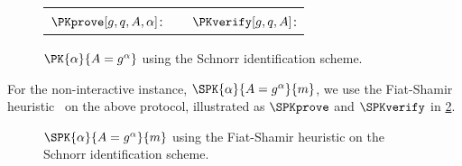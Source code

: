 \begin{figure*}
  \centering
  \begin{tabular}{lcl}
    \(\PKprove[g, q, A, \alpha]\):
    &
    & \(\PKverify[g, q, A]\):
    \\

  \end{tabular}
  \caption{%
    \(\PK{\alpha}{A = g^\alpha}\) using the Schnorr identification scheme.
  }%
  \label{PKalgorithms}
\end{figure*}


For the non-interactive instance, \(\SPK{\alpha}{A = g^\alpha}{m}\), we use the 
Fiat-Shamir heuristic~\cite{FiatShamirHeuristic} on the above protocol, 
illustrated as \(\SPKprove\) and \(\SPKverify\) in \cref{SPKalgorithms}.

\begin{figure*}
  \begin{minipage}[t]{0.48\linewidth}
    \begin{algorithmic}
      \EndFunction{}
    \end{algorithmic}
  \end{minipage}
  \hfill
  \begin{minipage}[t]{0.48\linewidth}
    \begin{algorithmic}
        \Else{}
        \EndIf{}
      \EndFunction{}
    \end{algorithmic}
  \end{minipage}
  \caption{%
    \(\SPK{\alpha}{A = g^\alpha}{m}\) using the Fiat-Shamir heuristic on the 
    Schnorr identification scheme.
  }%
  \label{SPKalgorithms}
\end{figure*}
